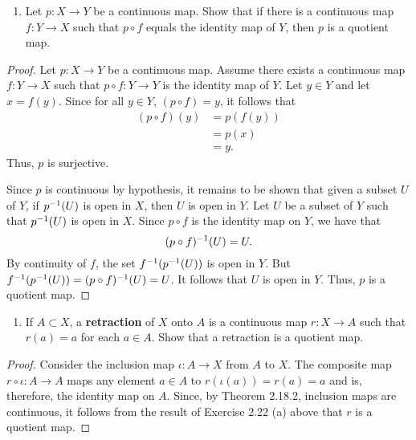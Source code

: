 \begin{solution}
  \begin{enumerate}[label={(\alph*)}, align=left, leftmargin=\parindent, listparindent=\parindent, labelwidth=0pt, itemindent=!]
    \item
      Let $p: X \rightarrow Y$ be a continuous map.
      Show that if there is a continuous map $f: Y \rightarrow X$ such that $p \circ f$ equals the identity map of $Y$, then $p$ is a quotient map.
  \end{enumerate}
  \begin{proof}
    Let $p: X \rightarrow Y$ be a continuous map.
    Assume there exists a continuous map $f: Y \rightarrow X$ such that $p \circ f: Y \rightarrow Y$ is the identity map of $Y$.
    Let $y \in Y$ and let $x = f(y)$.
    Since for all $y \in Y$, $(p \circ f) = y$, it follows that
    \begin{align*}
      (p \circ f)(y) &= p(f(y)) \\
                     &= p(x) \\
                     &= y.
    \end{align*}
    Thus, $p$ is surjective.

    Since $p$ is continuous by hypothesis, it remains to be shown that given a subset $U$ of $Y$, if $p^{-1}(U)$ is open in $X$, then $U$ is open in $Y$.
    Let $U$ be a subset of $Y$ such that $p^{-1}(U)$ is open in $X$.
    Since $p \circ f$ is the identity map on $Y$, we have that
    \begin{equation*}
      (p \circ f)^{-1}(U) = U.
    \end{equation*}
    By continuity of $f$, the set $f^{-1}(p^{-1}(U))$ is open in $Y$.
    But $f^{-1}(p^{-1}(U)) = (p \circ f)^{-1}(U) = U$.
    It follows that $U$ is open in $Y$.
    Thus, $p$ is a quotient map.
  \end{proof}
  \bigskip

  \begin{enumerate}[label={(\alph*)}, align=left, leftmargin=\parindent, listparindent=\parindent, labelwidth=0pt, itemindent=!]
    \addtocounter{enumi}{1} 
    \item
      If $A \subset X$, a \textbf{retraction} of $X$ onto $A$ is a continuous map $r: X \rightarrow A$ such that $r(a) = a$ for each $a \in A$.
      Show that a retraction is a quotient map.
  \end{enumerate}
  \begin{proof}
    Consider the inclusion map $\iota: A \rightarrow X$ from $A$ to $X$.
    The composite map $r \circ \iota: A \rightarrow A$ maps any element $a \in A$ to $r(\iota(a)) = r(a) = a$ and is, therefore, the identity map on $A$.
    Since, by Theorem 2.18.2, inclusion maps are continuous, it follows from the result of Exercise 2.22 (a) above that $r$ is a quotient map.
  \end{proof}
\end{solution}
\newpage

